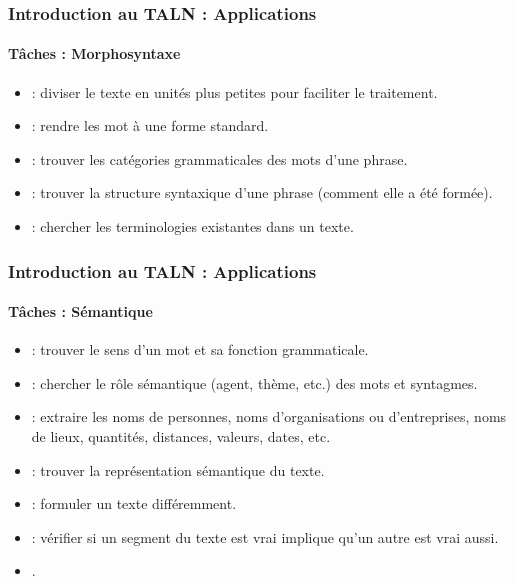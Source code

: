 \documentclass[xcolor=table]{beamer}
\begin{document}
\begin{frame}
\frametitle{Introduction au TALN : Applications}
\framesubtitle{Tâches : Morphosyntaxe}

\begin{itemize}
	\item {} : diviser le texte en unités plus petites pour faciliter le traitement.
	\item {} : rendre les mot à une forme standard.
	\item {} : trouver les catégories grammaticales des mots d'une phrase.
	\item {} : trouver la structure syntaxique d'une phrase (comment elle a été formée).
	\item {} : chercher les terminologies existantes dans un texte.
\end{itemize}

\end{frame}

\begin{frame}
\frametitle{Introduction au TALN : Applications}
\framesubtitle{Tâches : Sémantique}

\begin{itemize}
	\item {} : trouver le sens d'un mot et sa fonction grammaticale.
	\item {} : chercher le rôle sémantique (agent, thème, etc.) des mots et syntagmes.
	\item {} : extraire les noms de personnes, noms d'organisations ou d'entreprises, noms de lieux, quantités, distances, valeurs, dates, etc.
	\item {} : trouver la représentation sémantique du texte.
	\item {} : formuler un texte différemment.
	\item {} : vérifier si un segment du texte est vrai implique qu'un autre est vrai aussi.
	\item {}.
\end{itemize}

\end{frame}
\end{document}
